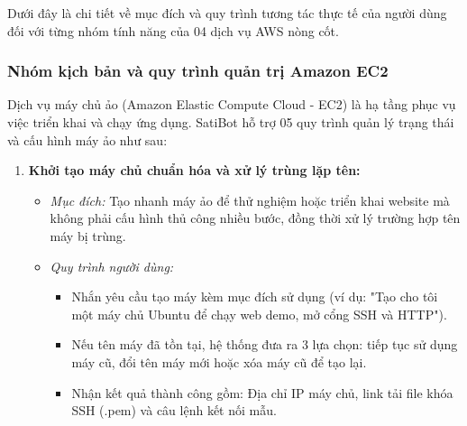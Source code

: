 \documentclass[a4paper,12pt]{article}
\begin{document}
Dưới đây là chi tiết về mục đích và quy trình tương tác thực tế của người dùng đối với từng nhóm tính năng của 04 dịch vụ AWS nòng cốt.

\subsubsection{Nhóm kịch bản và quy trình quản trị Amazon EC2}

Dịch vụ máy chủ ảo (Amazon Elastic Compute Cloud - EC2) là hạ tầng phục vụ việc triển khai và chạy ứng dụng. SatiBot hỗ trợ 05 quy trình quản lý trạng thái và cấu hình máy ảo như sau:

\begin{enumerate}
  \item \textbf{Khởi tạo máy chủ chuẩn hóa và xử lý trùng lặp tên:}
  \begin{itemize}
    \item \textit{Mục đích:} Tạo nhanh máy ảo để thử nghiệm hoặc triển khai website mà không phải cấu hình thủ công nhiều bước, đồng thời xử lý trường hợp tên máy bị trùng.
    \item \textit{Quy trình người dùng:} 
    \begin{itemize}
      \item Nhắn yêu cầu tạo máy kèm mục đích sử dụng (ví dụ: "Tạo cho tôi một máy chủ Ubuntu để chạy web demo, mở cổng SSH và HTTP").
      \item Nếu tên máy đã tồn tại, hệ thống đưa ra 3 lựa chọn: tiếp tục sử dụng máy cũ, đổi tên máy mới hoặc xóa máy cũ để tạo lại.
      \item Nhận kết quả thành công gồm: Địa chỉ IP máy chủ, link tải file khóa SSH (.pem) và câu lệnh kết nối mẫu.
    \end{itemize}
  \end{itemize}


\end{enumerate}
\end{document}

